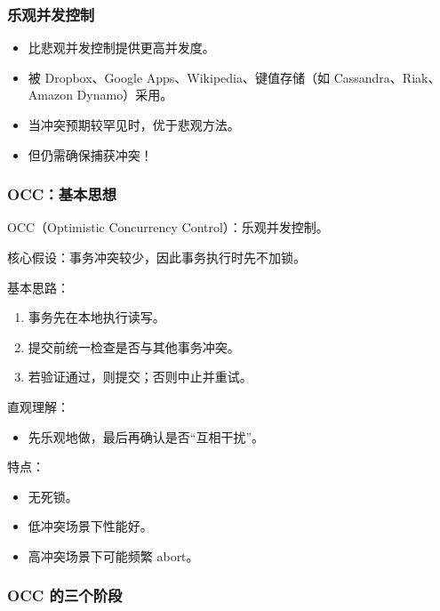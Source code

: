 \subsubsection{乐观并发控制}

\begin{itemize}
  \item 比悲观并发控制提供更高并发度。
  \item 被 Dropbox、Google Apps、Wikipedia、键值存储（如 Cassandra、Riak、Amazon Dynamo）采用。
  \item 当冲突预期较罕见时，优于悲观方法。
  \item 但仍需确保捕获冲突！
\end{itemize}

\subsubsection{OCC：基本思想}

OCC（Optimistic Concurrency Control）：乐观并发控制。

核心假设：事务冲突较少，因此事务执行时先不加锁。

基本思路：

\begin{enumerate}
  \item 事务先在本地执行读写。
  \item 提交前统一检查是否与其他事务冲突。
  \item 若验证通过，则提交；否则中止并重试。
\end{enumerate}

直观理解：

\begin{itemize}
  \item 先乐观地做，最后再确认是否“互相干扰”。
\end{itemize}

特点：

\begin{itemize}
  \item 无死锁。
  \item 低冲突场景下性能好。
  \item 高冲突场景下可能频繁 abort。
\end{itemize}

\subsubsection{OCC 的三个阶段}

